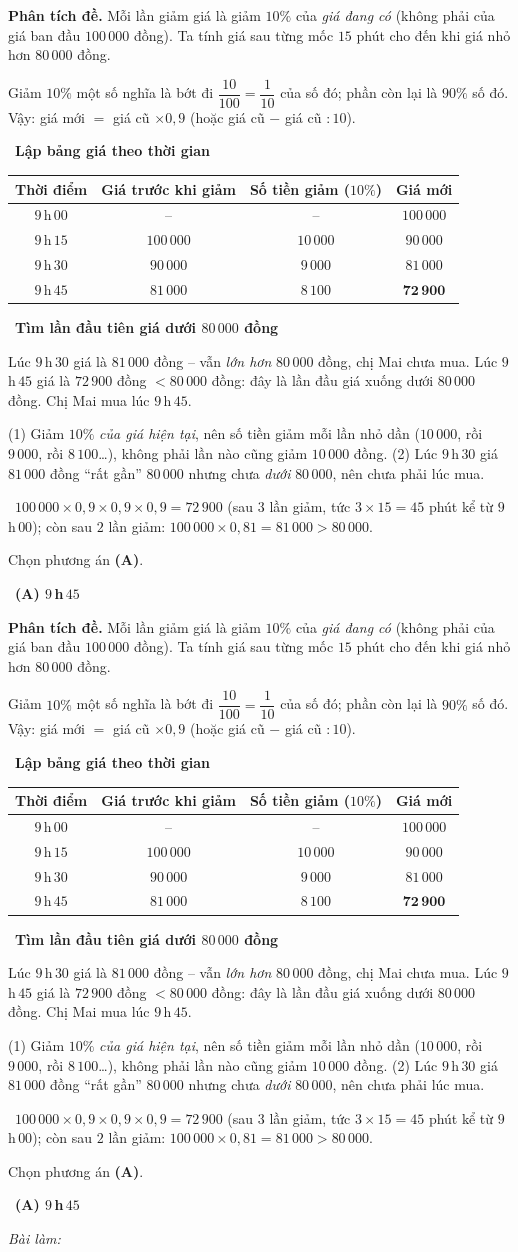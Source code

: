 \documentclass[11pt]{article}
\newif\ifsol \soltrue
\providecommand{\AnsWord}{Đáp số}
\newcommand{\ans}[1]{\par\smallskip{\bfseries\color{tmGreen!88!black}\AnsWord:}\ {\bfseries\color{AnsRed}#1}\par}
\newcommand{\probsol}[1]{%
  \begin{lrbox}{\solmeasure}\begin{minipage}{\dimexpr\linewidth-24pt\relax}#1\end{minipage}\end{lrbox}%
  \ifsol
    \begin{solbox}#1\end{solbox}%
  \else
    \setlength{\solht}{\dimexpr\ht\solmeasure+\dp\solmeasure+0.85cm\relax}%
    \ifdim\solht<1.35cm\setlength{\solht}{1.35cm}\fi
    \ifdim\solht>\StudentMaxWork\setlength{\solht}{\StudentMaxWork}\fi
    \begin{tcolorbox}[colback=white,colframe=Line,boxrule=0.8pt,arc=5pt,
      left=8pt,right=8pt,top=4pt,bottom=4pt,height=\solht]{\footnotesize\color{Slate}\itshape\WorkWord}\end{tcolorbox}%
  \fi}
\newlength{\StudentMaxWork}\setlength{\StudentMaxWork}{7.5cm}
\newcommand{\step}[2]{\par\smallskip\noindent{\bfseries\color{tmBlue!85!black}\StepWord~#1.}\ {\bfseries #2}\par\nopagebreak}
\newcommand{\verify}[1]{\par\smallskip\noindent{\bfseries\color{tmGreen!80!black}\faCheckCircle\ \CheckWord}\ #1\par}
\def\WorkWord{Bài làm:}
\def\AnsWord{Đáp số}
\def\StepWord{Bước}
\def\CheckWord{Thử lại:}
\begin{document}
\probsol{
\textbf{Phân tích đề.} Mỗi lần giảm giá là giảm $10\%$ của \emph{giá đang có} (không phải của giá ban đầu $100\,000$ đồng). Ta tính giá sau từng mốc $15$ phút cho đến khi giá nhỏ hơn $80\,000$ đồng.

\begin{recallbox}Giảm $10\%$ một số nghĩa là bớt đi $\dfrac{10}{100}=\dfrac1{10}$ của số đó; phần còn lại là $90\%$ số đó. Vậy: giá mới $=$ giá cũ $\times 0{,}9$ (hoặc giá cũ $-$ giá cũ $:10$).\end{recallbox}

\step{1}{Lập bảng giá theo thời gian}
\begin{center}
\begin{tabular}{|c|c|c|c|}
\hline
\rowcolor{Tint}\textbf{Thời điểm} & \textbf{Giá trước khi giảm} & \textbf{Số tiền giảm ($10\%$)} & \textbf{Giá mới}\\
\hline
$9\,$h$\,00$ & -- & -- & $100\,000$\\
$9\,$h$\,15$ & $100\,000$ & $10\,000$ & $90\,000$\\
$9\,$h$\,30$ & $90\,000$ & $9\,000$ & $81\,000$\\
$9\,$h$\,45$ & $81\,000$ & $8\,100$ & $\mathbf{72\,900}$\\
\hline
\end{tabular}
\end{center}

\step{2}{Tìm lần đầu tiên giá dưới $80\,000$ đồng}
Lúc $9\,$h$\,30$ giá là $81\,000$ đồng -- vẫn \emph{lớn hơn} $80\,000$ đồng, chị Mai chưa mua. Lúc $9\,$h$\,45$ giá là $72\,900$ đồng $<80\,000$ đồng: đây là lần đầu giá xuống dưới $80\,000$ đồng. Chị Mai mua lúc $9\,$h$\,45$.

\begin{warnbox}(1) Giảm $10\%$ \emph{của giá hiện tại}, nên số tiền giảm mỗi lần nhỏ dần ($10\,000$, rồi $9\,000$, rồi $8\,100$\dots), không phải lần nào cũng giảm $10\,000$ đồng. (2) Lúc $9\,$h$\,30$ giá $81\,000$ đồng ``rất gần'' $80\,000$ nhưng chưa \emph{dưới} $80\,000$, nên chưa phải lúc mua.\end{warnbox}

\verify{$100\,000\times 0{,}9\times 0{,}9\times 0{,}9=72\,900$ (sau $3$ lần giảm, tức $3\times 15=45$ phút kể từ $9\,$h$\,00$); còn sau $2$ lần giảm: $100\,000\times0{,}81=81\,000>80\,000$.}
Chọn phương án \textbf{(A)}.
\ans{(A) $9\,$h$\,45$}
}
\end{document}
